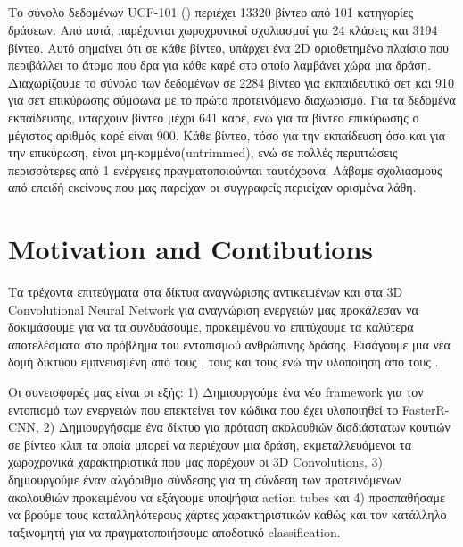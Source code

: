 \subsection{}
Το σύνολο δεδομένων \en UCF-101 (\cite{soomro2012ucf101}) \gr περιέχει 13320 βίντεο από 101 κατηγορίες δράσεων.
Από αυτά, παρέχονται χωροχρονικοί  σχολιασμοί για 24 κλάσεις  και 3194 βίντεο. Αυτό σημαίνει ότι σε κάθε βίντεο, υπάρχει ένα \en 2D \gr οριοθετημένο πλαίσιο που περιβάλλει
το άτομο που δρα για κάθε καρέ στο οποίο λαμβάνει χώρα μια δράση.
Διαχωρίζουμε το σύνολο των δεδομένων  σε 2284 βίντεο για εκπαιδευτικό σετ και 910 για σετ επικύρωσης σύμφωνα με το
πρώτο προτεινόμενο διαχωρισμό. Για τα δεδομένα εκπαίδευσης, υπάρχουν βίντεο μέχρι 641 καρέ, ενώ για τα βίντεο επικύρωσης ο μέγιστος αριθμός καρέ είναι 900.
Κάθε βίντεο, τόσο για την εκπαίδευση όσο και για την επικύρωση, είναι μη-κομμένο(\en untrimmed\gr), ενώ σε πολλές περιπτώσεις  περισσότερες από 1 ενέργειες πραγματοποιούνται ταυτόχρονα.
Λάβαμε σχολιασμούς από \en \cite{singh2016online} \gr επειδή εκείνους που μας παρείχαν οι συγγραφείς περιείχαν ορισμένα λάθη.

\section{\en Motivation and Contibutions\gr}
Τα τρέχοντα επιτεύγματα στα δίκτυα αναγνώρισης αντικειμένων και στα \en 3D Convolutional Neural Network \gr για  αναγνώριση ενεργειών μας προκάλεσαν να δοκιμάσουμε
για να τα συνδυάσουμε, προκειμένου να επιτύχουμε τα καλύτερα αποτελέσματα στο πρόβλημα του εντοπισμoύ ανθρώπινης δράσης. Εισάγουμε μια νέα δομή δικτύου εμπνευσμένη από τους
\en\cite{DBLP:journals/corr/HouCS17}\gr, τους \en\cite{DBLP:journals/corr/abs-1712-09184}\gr και τους \en \cite{Ren:2015:FRT:2969239.2969250} \gr ενώ την  υλοποίηση από τους \en \cite{jjfaster2rcnn}\gr.

Οι συνεισφορές μας είναι οι εξής: 1) Δημιουργούμε ένα νέο \en framework \gr για τον εντοπισμό των ενεργειών που επεκτείνει τον κώδικα που έχει υλοποιηθεί το \en FasterR-CNN\gr,
2) Δημιουργήσαμε ένα δίκτυο για  πρόταση ακολουθιών δισδιάστατων κουτιών σε βίντεο κλιπ τα οποία μπορεί να περιέχουν μια δράση, εκμεταλλευόμενοι 
τα χωροχρονικά χαρακτηριστικά που μας παρέχουν οι \en 3D Convolutions\gr, 3) δημιουργούμε έναν αλγόριθμο σύνδεσης για τη σύνδεση των προτεινόμενων ακολουθιών
προκειμένου να εξάγουμε υποψήφια \en action tubes \gr και 4) προσπαθήσαμε να βρούμε τους καταλληλότερους χάρτες χαρακτηριστικών καθώς και τον κατάλληλο ταξινομητή για να
πραγματοποιήσουμε αποδοτικό \en classification\gr.
